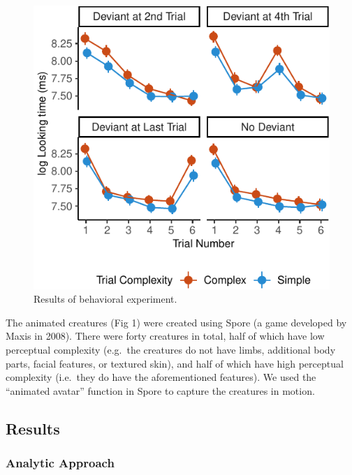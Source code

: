 \documentclass[10pt, letterpaper]{article}
\newenvironment{CodeChunk}{}{}
\begin{document}
\begin{CodeChunk}
\begin{figure}[H]

{\centering \includegraphics{figs/behavioral_result-1} 

}

\caption[Results of behavioral experiment]{Results of behavioral experiment.}\label{fig:behavioral_result}
\end{figure}
\end{CodeChunk}

The animated creatures (Fig 1) were created using Spore (a game
developed by Maxis in 2008). There were forty creatures in total, half
of which have low perceptual complexity (e.g.~the creatures do not have
limbs, additional body parts, facial features, or textured skin), and
half of which have high perceptual complexity (i.e.~they do have the
aforementioned features). We used the ``animated avatar'' function in
Spore to capture the creatures in motion.

\hypertarget{results}{%
\subsection{Results}\label{results}}

\hypertarget{analytic-approach}{%
\subsubsection{Analytic Approach}\label{analytic-approach}}
\end{document}
